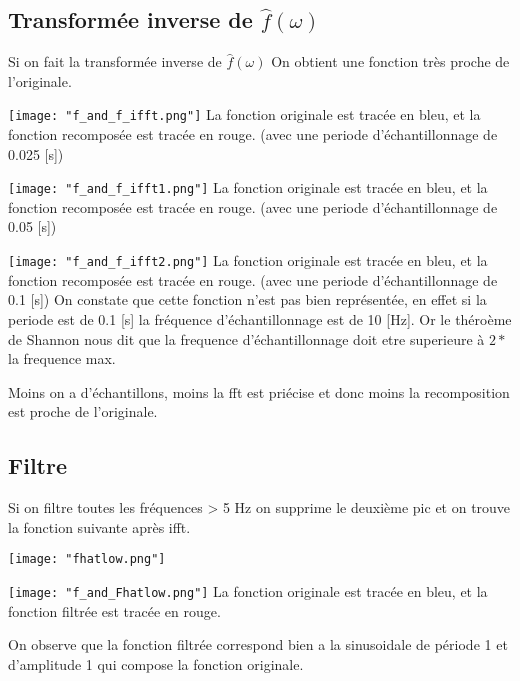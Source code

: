 \documentclass[a4paper,11pt]{article}
\begin{document}
\subsection{Transformée inverse de $\hat{f}(\omega)$}
Si on fait la transformée inverse de $\hat{f}(\omega)$
On obtient une fonction très proche de l'originale.
\begin{center}
\texttt{[image: "f\_and\_f\_ifft.png"]} \newline
La fonction originale est tracée en bleu, et la fonction recomposée est tracée en rouge. (avec une periode d'échantillonnage de 0.025 [s]) 
\end{center} 

\begin{center}
\texttt{[image: "f\_and\_f\_ifft1.png"]} \newline
La fonction originale est tracée en bleu, et la fonction recomposée est tracée en rouge. (avec une periode d'échantillonnage de 0.05 [s]) 
\end{center} 

\begin{center}
\texttt{[image: "f\_and\_f\_ifft2.png"]} \newline
La fonction originale est tracée en bleu, et la fonction recomposée est tracée en rouge. (avec une periode d'échantillonnage de 0.1 [s])  On constate que cette fonction n'est pas bien représentée, en effet si la periode est de 0.1 [s] la fréquence d'échantillonnage est de 10 [Hz]. Or le théroème de Shannon nous dit que la frequence d'échantillonnage doit etre superieure à $2 *$ la frequence max.
\end{center} 

Moins on a d'échantillons, moins la fft est priécise et donc moins la recomposition est proche de l'originale.

\subsection{Filtre}
Si on filtre toutes les fréquences > 5 Hz on supprime le deuxième pic et on trouve la fonction suivante après ifft.
\begin{center}
\texttt{[image: "fhatlow.png"]} \newline
\end{center}
\begin{center}
\texttt{[image: "f\_and\_Fhatlow.png"]} \newline
La fonction originale est tracée en bleu, et la fonction filtrée est tracée en rouge.
\end{center}
On observe que la fonction filtrée correspond bien a la sinusoidale de période 1 et d'amplitude 1 qui compose la fonction originale. \newline
\end{document}
